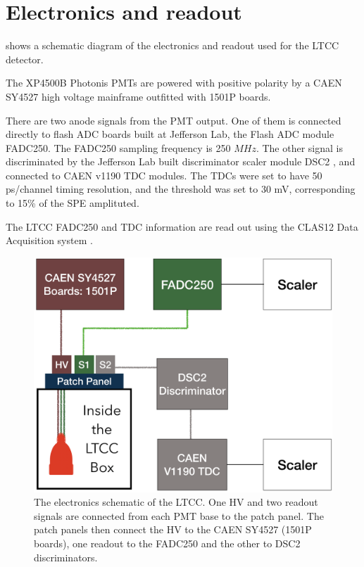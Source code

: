 \section{Electronics and readout}

 shows a schematic diagram of the electronics and readout used for the LTCC detector.

The XP4500B Photonis PMTs are powered with positive polarity by a CAEN SY4527 high voltage mainframe outfitted with 1501P boards.

There are two anode signals from the PMT output. One of them is connected directly to flash ADC
boards built at Jefferson Lab, the Flash ADC module FADC250. The FADC250 sampling frequency is 250 $MHz$.
The other signal is discriminated by the Jefferson Lab built discriminator scaler module DSC2 \cite{daq2019}, and connected to CAEN v1190 TDC modules.
The TDCs were set to have 50 ps/channel timing resolution, and the threshold was set to 30 mV, corresponding to 15\% of the SPE amplituted.

The LTCC FADC250 and TDC information are read out using the CLAS12 Data Acquisition system \cite{daq2019}.

\begin{figure}
	\centering
	\includegraphics[width=0.95\columnwidth,keepaspectratio]{img/electronicScheme.png}
	\caption{The electronics schematic of the LTCC. One HV and two readout signals are connected from each PMT base to the patch panel.
		     The patch panels then connect the HV to the CAEN SY4527 (1501P boards), one readout to the FADC250
             and the other to DSC2 discriminators.}
	\label{fig:electronicScheme}
\end{figure}


